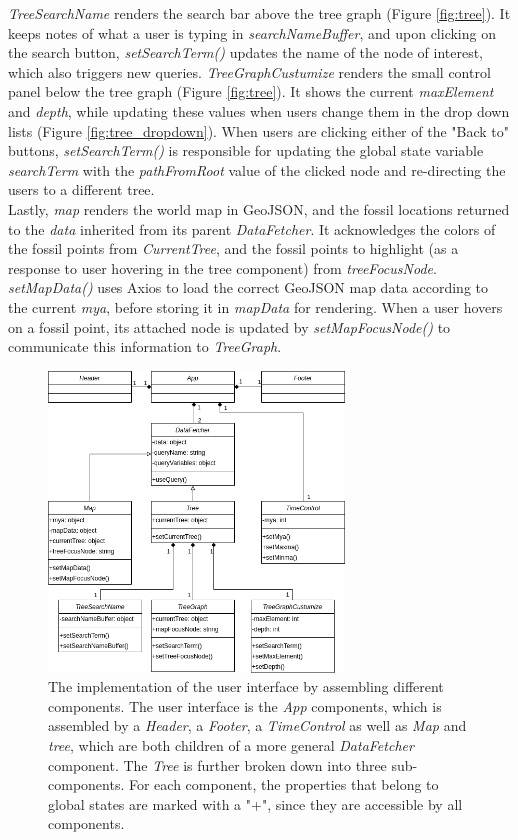 \documentclass[11pt, a4paper,oneside,chapterprefix=false]{scrbook}
\begin{document}
\emph{TreeSearchName} renders the search bar above the tree graph (Figure \ref{fig:tree}). It keeps notes of what a user is typing in \emph{searchNameBuffer}, and upon clicking on the search button, \emph{setSearchTerm()} updates the name of the node of interest, which also triggers new queries. \emph{TreeGraphCustumize} renders the small control panel below the tree graph (Figure \ref{fig:tree}). It shows the current \emph{maxElement} and \emph{depth}, while updating these values when users change them in the drop down lists (Figure \ref{fig:tree_dropdown}). When users are clicking either of the "Back to" buttons, \emph{setSearchTerm()} is responsible for updating the global state variable \emph{searchTerm} with the \emph{pathFromRoot} value of the clicked node and re-directing the users to a different tree. \\

Lastly, \emph{map} renders the world map in GeoJSON, and the fossil locations returned to the \emph{data} inherited from its parent \emph{DataFetcher}. It acknowledges the colors of the fossil points from \emph{CurrentTree}, and the fossil points to highlight (as a response to user hovering in the tree component) from \emph{treeFocusNode}. \emph{setMapData()} uses Axios to load the correct GeoJSON map data according to the current \emph{mya}, before storing it in \emph{mapData} for rendering. When a user hovers on a fossil point, its attached node is updated by \emph{setMapFocusNode()} to communicate this information to \emph{TreeGraph}.

\begin{figure}[h]
	\centering
	\includegraphics[width=0.7\textwidth]{figures/implementation/components}
	\caption{The implementation of the user interface by assembling different components. The user interface is the \emph{App} components, which is assembled by a \emph{Header}, a \emph{Footer}, a \emph{TimeControl} as well as \emph{Map} and \emph{tree}, which are both children of a more general \emph{DataFetcher} component. The \emph{Tree} is further broken down into three sub-components. For each component, the properties that belong to global states are marked with a "+", since they are accessible by all components.}
	\label{fig:components}
\end{figure}
\end{document}
